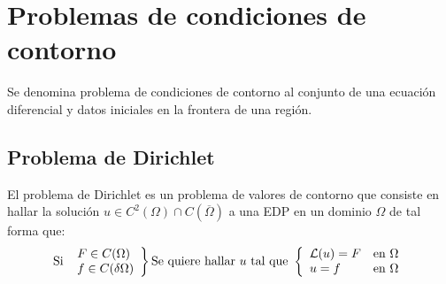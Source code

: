 \section{Problemas de condiciones de contorno}
Se denomina problema de condiciones de contorno al conjunto de una ecuación diferencial y datos iniciales en la frontera de una región.

\subsection{Problema de Dirichlet}
El problema de Dirichlet es un problema de valores de contorno que consiste en hallar la solución $u \in C^2(\Omega)\cap C(\overline{\Omega})$ a una EDP en un dominio $\Omega$ de tal forma que:
\begin{equation*}
\text{Si }
\left.
\begin{array}{l}
F\in C(\Omega)\\
f\in C(\delta\Omega)
\end{array}
\right\}
\text{Se quiere hallar } u\text{ tal que }
\left\{
\begin{array}{l r}
\mathcal{L}(u) = F &\text{en } \Omega\\
u = f &\text{en } \Omega\\
\end{array}
\right.
\end{equation*}